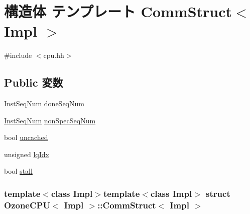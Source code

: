 \hypertarget{structOzoneCPU_1_1CommStruct}{
\section{構造体 テンプレート CommStruct$<$ Impl $>$}
\label{structOzoneCPU_1_1CommStruct}
}


{\ttfamily \#include $<$cpu.hh$>$}\subsection*{Public 変数}
\begin{DoxyCompactItemize}
\item 
\hyperlink{inst__seq_8hh_a258d93d98edaedee089435c19ea2ea2e}{InstSeqNum} \hyperlink{structOzoneCPU_1_1CommStruct_a45920c1d79a22b1320274c5f53504654}{doneSeqNum}
\item 
\hyperlink{inst__seq_8hh_a258d93d98edaedee089435c19ea2ea2e}{InstSeqNum} \hyperlink{structOzoneCPU_1_1CommStruct_a2109aaf648ce5c87f53ac688b4e51db1}{nonSpecSeqNum}
\item 
bool \hyperlink{structOzoneCPU_1_1CommStruct_aab896ca9f63476ee85c0cac2bbff0811}{uncached}
\item 
unsigned \hyperlink{structOzoneCPU_1_1CommStruct_a76af8a7e5552d224f4a533370ebdf9e9}{lqIdx}
\item 
bool \hyperlink{structOzoneCPU_1_1CommStruct_a8b9d194898424469999ed72a43cfd488}{stall}
\end{DoxyCompactItemize}
\subsubsection*{template$<$class Impl$>$template$<$class Impl$>$ struct OzoneCPU$<$ Impl $>$::CommStruct$<$ Impl $>$}



